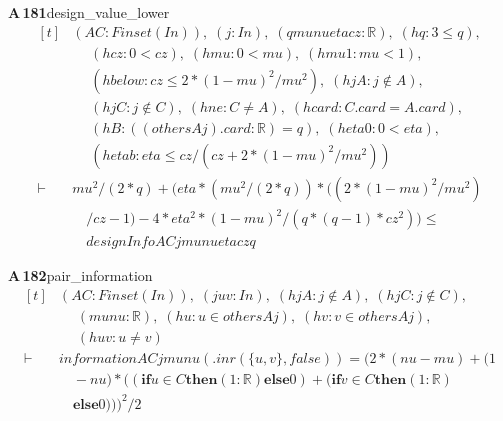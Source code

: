 \documentclass[conference]{IEEEtran}
\theoremstyle{definition}
\newcommand{\lean}[1]{\textsf{\footnotesize #1}}
\begin{document}
\noindent\textbf{A\,181}\quad\lean{design\_value\_lower}
{\footnotesize\[ \begin{aligned}[t]
&(\mathit{A} \mathit{C} : \mathit{Finset} (\mathit{I} \mathit{n})),\; (\mathit{j} : \mathit{I} \mathit{n}),\; (\mathit{q} \mathit{mu} \mathit{nu} \mathit{eta} \mathit{cz} : \mathbb{R} ),\; (\mathit{hq} : 3 \leq \mathit{q}),\\
&\quad \; (\mathit{hcz} : 0 < \mathit{cz}),\; (\mathit{hmu} : 0 < \mathit{mu}),\; (\mathit{hmu1} : \mathit{mu} < 1),\\
&\quad \; (\mathit{hbelow} : \mathit{cz} \leq 2*(1-\mathit{mu})^{2}/\mathit{mu}^{2}),\; (\mathit{hjA} : \mathit{j} \notin \mathit{A}),\\
&\quad \; (\mathit{hjC} : \mathit{j} \notin \mathit{C}),\; (\mathit{hne} : \mathit{C} \neq \mathit{A}),\; (\mathit{hcard} : \mathit{C}.\mathit{card} = \mathit{A}.\mathit{card}),\\
&\quad \; (\mathit{hB} : ((\mathit{others} \mathit{A} \mathit{j}).\mathit{card} : \mathbb{R} ) = \mathit{q}),\; (\mathit{heta0} : 0 < \mathit{eta}),\\
&\quad \; (\mathit{hetab} : \mathit{eta} \leq \mathit{cz}/(\mathit{cz}+2*(1-\mathit{mu})^{2}/\mathit{mu}^{2}))\\
\vdash\;&\mathit{mu}^{2}/(2*\mathit{q}) + (\mathit{eta}*(\mathit{mu}^{2}/(2*\mathit{q}))*((2*(1-\mathit{mu})^{2}/\mathit{mu}^{2})\\
&\quad /\mathit{cz}-1) - 4*\mathit{eta}^{2}*(1-\mathit{mu})^{2}/(\mathit{q}*(\mathit{q}-1)*\mathit{cz}^{2})) \leq\\
&\quad \mathit{designInfo} \mathit{A} \mathit{C} \mathit{j} \mathit{mu} \mathit{nu} \mathit{eta} \mathit{cz} \mathit{q}
\end{aligned} \]}

\noindent\textbf{A\,182}\quad\lean{pair\_information}
{\footnotesize\[ \begin{aligned}[t]
&(\mathit{A} \mathit{C} : \mathit{Finset} (\mathit{I} \mathit{n})),\; (\mathit{j} \mathit{u} \mathit{v} : \mathit{I} \mathit{n}),\; (\mathit{hjA} : \mathit{j} \notin \mathit{A}),\; (\mathit{hjC} : \mathit{j} \notin \mathit{C}),\\
&\quad \; (\mathit{mu} \mathit{nu} : \mathbb{R} ),\; (\mathit{hu} : \mathit{u} \in \mathit{others} \mathit{A} \mathit{j}),\; (\mathit{hv} : \mathit{v} \in \mathit{others} \mathit{A} \mathit{j}),\\
&\quad \; (\mathit{huv} : \mathit{u} \neq \mathit{v})\\
\vdash\;&\mathit{information} \mathit{A} \mathit{C} \mathit{j} \mathit{mu} \mathit{nu} (.\mathit{inr} (\{ \mathit{u},\mathit{v}\} ,\mathit{false})) = (2*(\mathit{nu}-\mathit{mu})+(1\\
&\quad -\mathit{nu})*((\mathbf{if} \mathit{u} \in \mathit{C} \mathbf{then} (1:\mathbb{R} ) \mathbf{else} 0)+(\mathbf{if} \mathit{v} \in \mathit{C} \mathbf{then} (1:\mathbb{R} )\\
&\quad \mathbf{else} 0)))^{2}/2
\end{aligned} \]}
\end{document}

